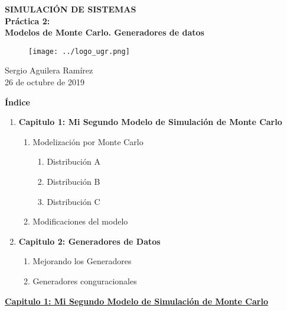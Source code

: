 \documentclass{article}
\begin{document}
	
	\begin{titlepage}
		\centering
		{\huge\textbf{SIMULACIÓN DE SISTEMAS \\ Práctica 2:\\ \vspace{0.5cm} Modelos de Monte Carlo. Generadores de datos}} \\
		
		\vspace{2cm}
		\begin{figure}[htb]
			\centering
			\texttt{[image: ../logo\_ugr.png]}
		\end{figure}
		\vspace{3cm}
		{\huge Sergio Aguilera Ramírez} \\
		\vspace{1cm}
		{\large 26 de octubre de 2019}
		
	\end{titlepage}
	
	
	
	\huge\textbf{Índice}
	\Large\begin{enumerate}
		\item\textbf{Capitulo 1: Mi Segundo Modelo de Simulación de
			Monte Carlo}
		\begin{enumerate}\large
			\item Modelización por Monte Carlo
				\begin{enumerate}
					\item Distribución A
					\item Distribución B
					\item Distribución C
				\end{enumerate}
			
			\item Modificaciones del modelo
		\end{enumerate}
		
		\item\textbf{Capitulo 2: Generadores de Datos}
		\begin{enumerate}\large
			\item Mejorando los Generadores
			\item Generadores conguracionales
		\end{enumerate}
	\end{enumerate}

	\newpage
	
	\Large\underline{\textbf{Capitulo 1: Mi Segundo Modelo de Simulación de Monte Carlo}} \\
	
\end{document}

